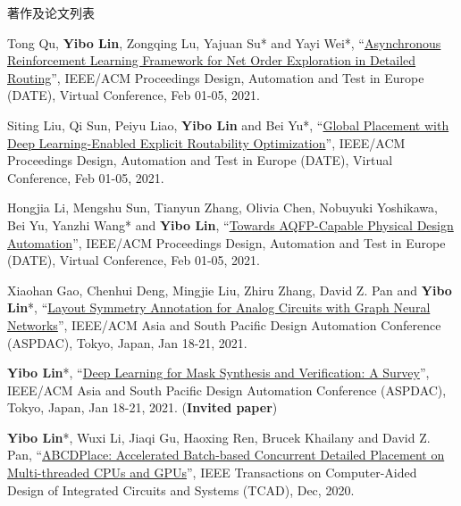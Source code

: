 \begin{rSection}{著作及论文列表}
\begin{description}[font=\normalfont, rightmargin=2em]
{}
            

\item[{[C68]}]{
        Tong Qu, \textbf{Yibo Lin}, Zongqing Lu, Yajuan Su* and Yayi Wei*, 
    ``\href{https://doi.org/10.23919/DATE51398.2021.9474007}{Asynchronous Reinforcement Learning Framework for Net Order Exploration in Detailed Routing}'', 
    IEEE/ACM Proceedings Design, Automation and Test in Europe (DATE), Virtual Conference, Feb 01-05, 2021.
    
}
            

\item[{[C67]}]{
        Siting Liu, Qi Sun, Peiyu Liao, \textbf{Yibo Lin} and Bei Yu*, 
    ``\href{https://doi.org/10.23919/DATE51398.2021.9473959}{Global Placement with Deep Learning-Enabled Explicit Routability Optimization}'', 
    IEEE/ACM Proceedings Design, Automation and Test in Europe (DATE), Virtual Conference, Feb 01-05, 2021.
    
}
            

\item[{[C66]}]{
        Hongjia Li, Mengshu Sun, Tianyun Zhang, Olivia Chen, Nobuyuki Yoshikawa, Bei Yu, Yanzhi Wang* and \textbf{Yibo Lin}, 
    ``\href{https://doi.org/10.23919/DATE51398.2021.9474259}{Towards AQFP-Capable Physical Design Automation}'', 
    IEEE/ACM Proceedings Design, Automation and Test in Europe (DATE), Virtual Conference, Feb 01-05, 2021.
    
}
            

\item[{[C65]}]{
        Xiaohan Gao, Chenhui Deng, Mingjie Liu, Zhiru Zhang, David Z. Pan and \textbf{Yibo Lin}*, 
    ``\href{https://doi.org/10.1145/3394885.3431545}{Layout Symmetry Annotation for Analog Circuits with Graph Neural Networks}'', 
    IEEE/ACM Asia and South Pacific Design Automation Conference (ASPDAC), Tokyo, Japan, Jan 18-21, 2021.
    
}
            

\item[{[C64]}]{
        \textbf{Yibo Lin}*, 
    ``\href{https://doi.org/10.1145/3394885.3431624}{Deep Learning for Mask Synthesis and Verification: A Survey}'', 
    IEEE/ACM Asia and South Pacific Design Automation Conference (ASPDAC), Tokyo, Japan, Jan 18-21, 2021.
    (\textbf{Invited paper})
}
            

\item[{[J63]}]{
        \textbf{Yibo Lin}*, Wuxi Li, Jiaqi Gu, Haoxing Ren, Brucek Khailany and David Z. Pan, 
    ``\href{https://doi.org/10.1109/TCAD.2020.2971531}{ABCDPlace: Accelerated Batch-based Concurrent Detailed Placement on Multi-threaded CPUs and GPUs}'', 
    IEEE Transactions on Computer-Aided Design of Integrated Circuits and Systems (TCAD), Dec, 2020.
    
}
\end{description}
\end{rSection}
